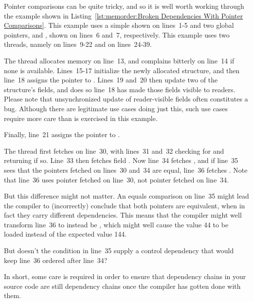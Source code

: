 Pointer comparisons can be quite tricky, and so it is well worth working
through the example shown in
Listing~\ref{lst:memorder:Broken Dependencies With Pointer Comparisons}.
This example uses a simple  shown on lines~1-5 and
two global pointers,  and , shown on lines~6 and~7,
respectively.
This example uses two threads, namely  on lines~9-22 and
 on lines~24-39.

The  thread allocates memory on line~13, and complains
bitterly on line~14 if none is available.
Lines~15-17 initialize the newly allocated structure, and then line~18
assigns the pointer to .
Lines~19 and~20 then update two of the structure's fields, and does
so  line~18 has made those fields visible to readers.
Please note that unsynchronized update of reader-visible fields
often constitutes a bug.
Although there are legitimate use cases doing just this, such use cases
require more care than is exercised in this example.

Finally, line~21 assigns the pointer to .

The  thread first fetches  on line~30, with
lines~31 and~32 checking for  and returning if so.
Line~33 then fetches field .
Now line~34 fetches , and if line~35 sees that the pointers
fetched on lines~30 and~34 are equal, line~36 fetches .
Note that line~36 uses pointer  fetched on line~30, not
pointer  fetched on line~34.

But this difference might not matter.
An equals comparison on line~35 might lead the compiler to (incorrectly)
conclude that both pointers are equivalent, when in fact they carry
different dependencies.
This means that the compiler might well transform line~36 to instead
be , which might well cause the value 44 to be loaded
instead of the expected value 144.

\QuickQuiz{}
	But doesn't the condition in line~35 supply a control dependency
	that would keep line~36 ordered after line~34?
 \QuickQuizEnd

In short, some care is required in order to ensure that dependency
chains in your source code are still dependency chains once the
compiler has gotten done with them.

